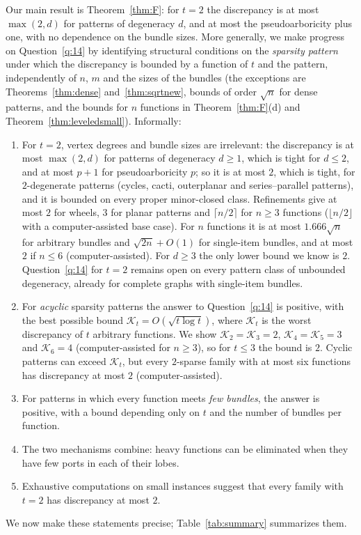 \documentclass[11pt,letterpaper]{article}
\theoremstyle{definition}
\begin{document}
Our main result is Theorem~\ref{thm:F}: for $t=2$ the discrepancy is at most $\max(2,d)$ for
patterns of degeneracy $d$, and at most the pseudoarboricity plus one, with no dependence on the bundle
sizes. More generally, we make progress on
Question~\ref{q:14} by identifying structural conditions on the
\emph{sparsity pattern} under which the discrepancy is bounded by a function of $t$ and the
pattern, independently of $n$, $m$ and the sizes of the bundles (the exceptions are
Theorems~\ref{thm:dense} and~\ref{thm:sqrtnew}, bounds of order $\sqrt n$ for dense patterns, and the
bounds for $n$ functions in Theorem~\ref{thm:F}(d) and Theorem~\ref{thm:leveledsmall}). Informally:
\begin{enumerate}[label=(\arabic*),itemsep=1pt]
\item For $t=2$, vertex degrees and bundle sizes are irrelevant: the discrepancy is at most
$\max(2,d)$ for patterns of degeneracy $d\ge1$, which is tight for $d\le2$, and at most $p+1$ for
pseudoarboricity $p$; so it is at most $2$, which is tight, for $2$-degenerate patterns (cycles,
cacti, outerplanar and series--parallel patterns), and it is bounded on every proper minor-closed
class. Refinements give at most $2$ for wheels, $3$ for planar patterns and $\lceil n/2\rceil$ for
$n\ge3$ functions ($\lfloor n/2\rfloor$ with a computer-assisted base case).
For $n$ functions it is at most $1.666\sqrt n$ for arbitrary bundles and $\sqrt{2n}+O(1)$ for
single-item bundles, and at most $2$ if $n\le6$ (computer-assisted). For $d\ge3$ the only lower
bound we know is $2$. Question~\ref{q:14} for $t=2$ remains open on every pattern class of unbounded
degeneracy, already for complete graphs with single-item bundles.
\item For \emph{acyclic} sparsity patterns the answer to Question~\ref{q:14} is positive, with the
best possible bound $\mathcal{K}_t=O(\sqrt{t\log t})$, where $\mathcal{K}_t$ is the worst discrepancy of $t$
arbitrary functions. We show $\mathcal{K}_2=\mathcal{K}_3=2$, $\mathcal{K}_4=\mathcal{K}_5=3$ and $\mathcal{K}_6=4$
(computer-assisted for $n\ge3$), so for $t\le3$ the bound is $2$. Cyclic
patterns can exceed $\mathcal{K}_t$, but every $2$-sparse family with at most six functions has discrepancy at
most $2$ (computer-assisted).
\item For patterns in which every function meets \emph{few bundles}, the answer is positive, with a
bound depending only on $t$ and the number of bundles per function.
\item The two mechanisms combine: heavy functions can be eliminated when they have few ports in
each of their lobes.
\item Exhaustive computations on small instances suggest that every family with $t=2$ has
discrepancy at most $2$.
\end{enumerate}
We now make these statements precise; Table~\ref{tab:summary} summarizes them.
\end{document}
